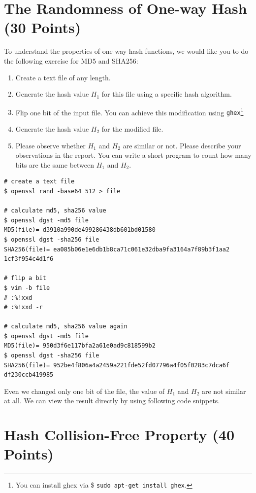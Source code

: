 \documentclass[11pt]{article}
\begin{document}
\section{The Randomness of One-way Hash (30 Points)}
To understand the properties of one-way hash functions, we would like you to do the following exercise for MD5
and SHA256:
\begin{enumerate}
\item Create a text file of any length.
\item Generate the hash value $H_1$ for this file using a specific hash algorithm.
\item Flip one bit of the input file. You can achieve this modification using {\tt ghex}\footnote{You can install ghex via \$ {\tt sudo apt-get install ghex}.}
\item Generate the hash value $H_2$ for the modified file.
\item Please observe whether $H_1$ and $H_2$ are similar or not. Please describe your observations in the report.
You can write a short program to count how many bits are the same between $H_1$ and $H_2$.
\end{enumerate}

\begin{verbatim}
# create a text file
$ openssl rand -base64 512 > file

# calculate md5, sha256 value
$ openssl dgst -md5 file
MD5(file)= d3910a990de499286438db601bd01580
$ openssl dgst -sha256 file
SHA256(file)= ea085b06e1e6db1b8ca71c061e32dba9fa3164a7f89b3f1aa2
1cf3f954c4d1f6

# flip a bit
$ vim -b file
# :%!xxd
# :%!xxd -r

# calculate md5, sha256 value again
$ openssl dgst -md5 file
MD5(file)= 950d3f6e117bfa2a61e0ad9c818599b2
$ openssl dgst -sha256 file
SHA256(file)= 952be4f806a4a2459a221fde52fd07796a4f05f0283c7dca6f
df230ccb419985
\end{verbatim}

Even we changed only one bit of the file, the value of $H_{1}$ and $H_{2}$ are not similar at all. We can view the result directly by using following code snippets.



\medskip

\section{Hash Collision-Free Property (40 Points)}
\end{document}
